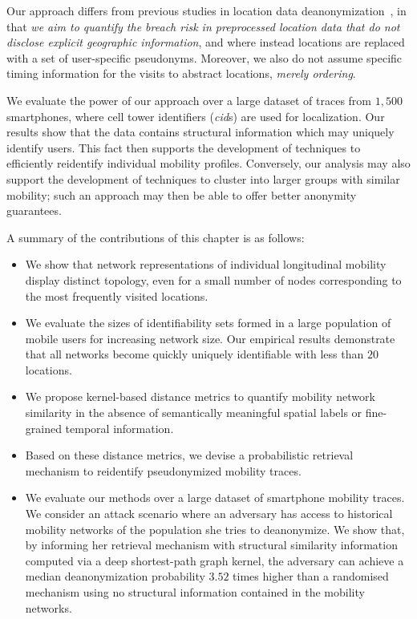 Our approach differs from previous studies in location data deanonymization~\cite{Gambs2014, deMulder08, Naini2016a, Golle2009}, in that \emph{we aim to quantify the breach risk in preprocessed location data that do not disclose explicit geographic information}, and where instead locations are replaced with a set of user-specific pseudonyms.
Moreover, we also do not assume specific timing information for the visits to abstract locations, \emph{merely ordering}.

We evaluate the power of our approach over a large dataset of traces from $1,500$ smartphones, where cell tower identifiers (\emph{cid}s) are used for localization.
Our results show that the data contains structural information which may uniquely identify users.
This fact then supports the development of techniques to efficiently reidentify individual mobility profiles.
Conversely, our analysis may also support the development of techniques to cluster into larger groups with similar mobility; such an approach may then be able to offer better anonymity guarantees.

A summary of the contributions of this chapter is as follows:

\begin{itemize}

\item We show that network representations of individual longitudinal mobility display distinct topology, even for a small number of nodes corresponding to the most frequently visited locations.

\item We evaluate the sizes of identifiability sets formed in a large population of mobile users for increasing network size.
Our empirical results demonstrate that all networks become quickly uniquely identifiable with less than $20$ locations.

\item We propose kernel-based distance metrics to quantify mobility network similarity in the absence of semantically meaningful spatial labels or fine-grained temporal information.

\item Based on these distance metrics, we devise a probabilistic retrieval mechanism to reidentify pseudonymized mobility traces.

\item We evaluate our methods over a large dataset of smartphone mobility traces. We consider an attack scenario where an adversary has access to historical mobility networks of the population she tries to deanonymize. We show that, by informing her retrieval mechanism with structural similarity information computed via a deep shortest-path graph kernel, the adversary can achieve a median deanonymization probability $3.52$ times higher than a randomised mechanism using no structural information contained in the mobility networks.

\end{itemize}

